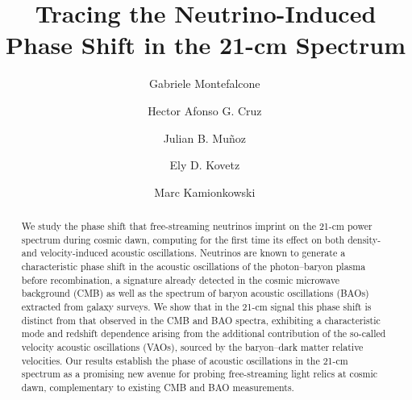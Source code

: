 \documentclass[floats,floatfix,showpacs,amssymb,prd,twocolumn,superscriptaddress,nofootinbib,reprint,preprintnumbers]{revtex4-2}
\begin{document}
\title{Tracing the Neutrino-Induced Phase Shift in the 21-cm Spectrum}


\author{Gabriele Montefalcone\,}

\author{Hector Afonso G. Cruz\,}



\author{Julian B. Mu\~noz\,} 

\author{Ely D. Kovetz\,} 

\author{Marc Kamionkowski\,}

\begin{abstract}


We study the phase shift that free-streaming neutrinos imprint on the 21-cm power spectrum during cosmic dawn, computing for the first time its effect on both density- and velocity-induced acoustic oscillations. Neutrinos are known to generate a characteristic phase shift in the acoustic oscillations of the photon–baryon plasma before recombination, a signature already detected in the cosmic microwave background (CMB) as well as the spectrum of baryon acoustic oscillations (BAOs) extracted from galaxy surveys. We show that in the 21-cm signal this phase shift is distinct from that observed in the CMB and BAO spectra, exhibiting a characteristic mode and redshift dependence arising from the additional contribution of the so-called velocity acoustic oscillations (VAOs), sourced by the baryon–dark matter relative velocities. Our results establish the phase of acoustic oscillations in the 21-cm spectrum as a promising new avenue for probing free-streaming light relics at cosmic dawn, complementary to existing CMB and BAO measurements.
\end{abstract}
\end{document}
